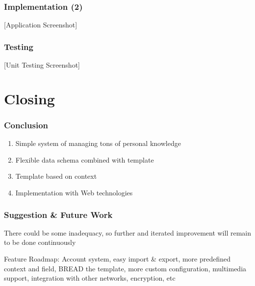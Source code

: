 \documentclass[10pt, compress]{beamer}
\begin{document}

\begin{frame}[fragile]
  \frametitle{Implementation (2)}

  [Application Screenshot]

\end{frame}


\begin{frame}[fragile]
  \frametitle{Testing}

  [Unit Testing Screenshot]

\end{frame}


\section{Closing}


\begin{frame}[fragile]
  \frametitle{Conclusion}

  \begin{enumerate}
    \item Simple system of managing tons of personal knowledge
    \item Flexible data schema combined with template
    \item Template based on context
    \item Implementation with Web technologies
  \end{enumerate}

\end{frame}


\begin{frame}[fragile]
  \frametitle{Suggestion \& Future Work}

  There could be some inadequacy, so further and iterated improvement will remain to be done continuously

  \begin{block}{Feature Roadmap:}
    Account system, easy import \& export, more predefined context and field, BREAD the template, more custom configuration, multimedia support, integration with other networks, encryption, etc
  \end{block}

\end{frame}



\end{document}
